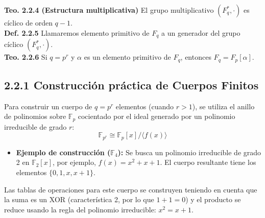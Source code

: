 \documentclass{article}
\begin{document}
\textbf{Teo. 2.2.4 (Estructura multiplicativa)} El grupo multiplicativo $(F_q^*, \cdot)$ es cíclico de orden $q - 1$.\\

\textbf{Def. 2.2.5} Llamaremos elemento primitivo de $F_q$ a un generador del grupo cíclico $(F_q^*, \cdot)$.\\

\textbf{Teo. 2.2.6} Si $q = p^r$ y $\alpha$ es un elemento primitivo de $F_q$, entonces $F_q = F_p[\alpha]$.

\subsection{2.2.1 Construcción práctica de Cuerpos Finitos}
Para construir un cuerpo de $q = p^r$ elementos (cuando $r > 1$), se utiliza el anillo de polinomios sobre $\mathbb{F}_p$ cocientado por el ideal generado por un polinomio irreducible de grado $r$:
\[\mathbb{F}_{p^r} \cong \mathbb{F}_p[x] / \langle f(x) \rangle\]

\begin{itemize}
\item \textbf{Ejemplo de construcción ($\mathbb{F}_4$):} Se busca un polinomio irreducible de grado 2 en $\mathbb{F}_2[x]$, por ejemplo, $f(x) = x^2+x+1$. El cuerpo resultante tiene los elementos $\{0, 1, x, x+1\}$.
\end{itemize}

Las tablas de operaciones para este cuerpo se construyen teniendo en cuenta que la suma es un XOR (característica 2, por lo que $1+1=0$) y el producto se reduce usando la regla del polinomio irreducible: $x^2 = x + 1$.
\end{document}
